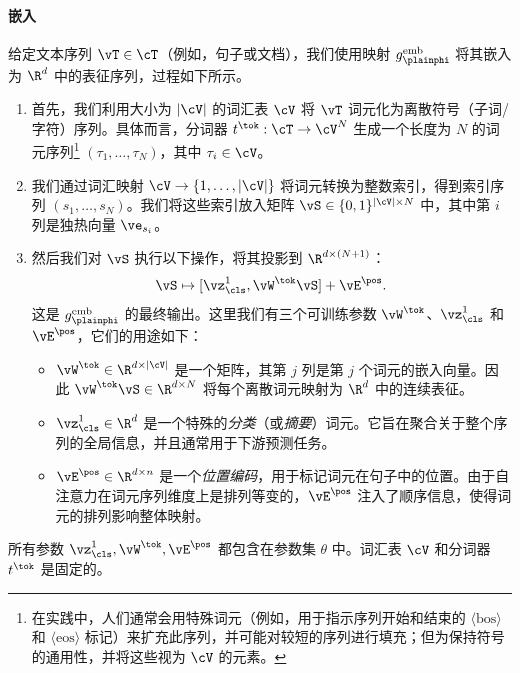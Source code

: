 \documentclass[../../book-main_zh.tex]{subfiles}
\begin{document}
\paragraph{嵌入} 给定文本序列 \(\vT \in \cT\)（例如，句子或文档），我们使用映射 \(g_{\plainphi}^{\text{emb}}\) 将其嵌入为 \(\R^d\) 中的表征序列，过程如下所示。
\begin{enumerate}
    \item 首先，我们利用大小为 \(|\cV|\) 的词汇表 \(\cV\) 将 \(\vT\) 词元化为离散符号（子词/字符）序列。具体而言，分词器 \(t^{\tok} : \cT \to \cV^{N}\) 生成一个长度为 \(N\) 的词元序列\footnote{在实践中，人们通常会用特殊词元（例如，用于指示序列开始和结束的 \(\langle \text{bos}\rangle\) 和 \(\langle \text{eos}\rangle\) 标记）来扩充此序列，并可能对较短的序列进行填充；但为保持符号的通用性，并将这些视为 \(\cV\) 的元素。} \((\tau_{1},\dots,\tau_{N})\)，其中 \(\tau_i \in \cV\)。
    \item 我们通过词汇映射 \(\cV\to\{1,\dots,|\cV|\}\) 将词元转换为整数索引，得到索引序列 \((s_{1},\dots,s_{N})\)。我们将这些索引放入矩阵 \(\vS \in \{0,1\}^{|\cV|\times N}\) 中，其中第 \(i\) 列是独热向量 \(\ve_{s_i}\)。
    \item 然后我们对 \(\vS\) 执行以下操作，将其投影到 \(\R^{d \times (N+1)}\)：
        \begin{equation}
            \vS \mapsto [\vz_{\cls}^{1}, \vW^{\tok}\vS] + \vE^{\pos}.
        \end{equation}
        这是 \(g_{\plainphi}^{\text{emb}}\) 的最终输出。这里我们有三个可训练参数 \(\vW^{\tok}\)、\(\vz_{\cls}^{1}\) 和 \(\vE^{\pos}\)，它们的用途如下：
        \begin{itemize}
            \item \(\vW^{\tok} \in \R^{d \times |\cV|}\) 是一个矩阵，其第 \(j\) 列是第 \(j\) 个词元的嵌入向量。因此 \(\vW^{\tok}\vS
                \in \R^{d\times N}\) 将每个离散词元映射为 \(\R^{d}\) 中的连续表征。
            \item \(\vz_{\cls}^{1} \in \R^{d}\) 是一个特殊的\textit{分类}（或\textit{摘要}）词元。它旨在聚合关于整个序列的全局信息，并且通常用于下游预测任务。
            \item \(\vE^{\pos} \in \R^{d \times n}\) 是一个\textit{位置编码}，用于标记词元在句子中的位置。由于自注意力在词元序列维度上是排列等变的，\(\vE^{\pos}\) 注入了顺序信息，使得词元的排列影响整体映射。
        \end{itemize}
\end{enumerate}
所有参数 \(\vz_{\cls}^{1}, \vW^{\tok}, \vE^{\pos}\) 都包含在参数集 \(\theta\) 中。词汇表 \(\cV\) 和分词器 \(t^{\tok}\) 是固定的。
\end{document}
